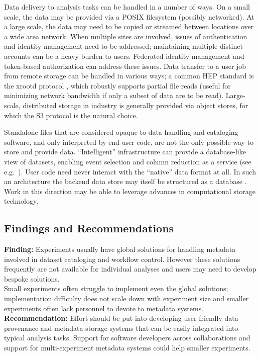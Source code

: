 Data delivery to analysis tasks can be handled in a number of ways. On a small scale, the data may be provided via a POSIX filesystem (possibly networked). At a large scale, the data may need to be copied or streamed between locations over a wide area network. When multiple sites are involved, issues of authentication and identity management need to be addressed; maintaining multiple distinct accounts can be a heavy burden to users. Federated identity management and token-based authorization can address these issues.  Data transfer to a user job from remote storage can be handled in various ways; a common HEP standard is the xrootd protocol \cite{xrootd}, which robustly supports partial file reads (useful for minimizing network bandwidth if only a subset of data are to be read). Large-scale, distributed storage in industry is generally provided via object stores, for which the S3 protocol is the natural choice.

Standalone files that are considered opaque to data-handling and cataloging software, and only interpreted by end-user code, are not the only possible way to store and provide data. ``Intelligent'' infrastructure can provide a database-like view of datasets, enabling event selection and column reduction as a service (see e.g.\ \cite{Galewsky:2020xig}). User code need never interact with the ``native'' data format at all. In such an architecture the backend data store may itself be structured as a database \cite{Gutsche:2020kmd}. Work in this direction may be able to leverage advances in computational storage technology.

\subsection{Findings and Recommendations}
\textbf{Finding:} Experiments usually have global solutions for handling metadata involved in dataset cataloging and workflow control. However these solutions frequently are not available for individual analyses and users may need to develop bespoke solutions.\\
Small experiments often struggle to implement even the global solutions; implementation difficulty does not scale down with experiment size and smaller experiments often lack personnel to devote to metadata systems.\\
\textbf{Recommendation:} Effort should be put into developing user-friendly data provenance and metadata storage systems that can be easily integrated into typical analysis tasks.  Support for software developers across collaborations and support for multi-experiment metadata systems could help smaller experiments.

